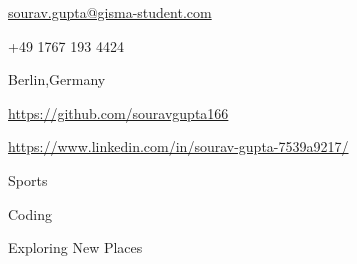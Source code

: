 \documentclass[11pt]{spidercv}
\begin{document}
    \begin{TopBar}{\ColorTextSide}

        \begin{DoubleColumns}
            \begin{ItemList}{\ColorHighlight}
                \item [\Large\faAt] \href{mailto:email@example.com}{sourav.gupta@gisma-student.com}
                \item [\Large\faMobile] +49 1767 193 4424                \item [\Large\faMapMarker] Berlin,Germany
            \end{ItemList}
            \nextcolumn
            \begin{ItemList}{\ColorHighlight}
                \item [\Large\faGithub] \href{https://github.com/ROMAINPC/Spider-CV}{https://github.com/souravgupta166}
                \item [\Large\faLinkedinSquare] \href{https://www.linkedin.com/}{https://www.linkedin.com/in/sourav-gupta-7539a9217/}
            \end{ItemList}
        \end{DoubleColumns}

        \begin{TripleColumns}
            \begin{ItemList}{\ColorHighlight}
                \item [] Sports
            \end{ItemList}
            \nextcolumn
            \begin{ItemList}{\ColorHighlight}
                \item [] Coding
            \end{ItemList}
            \nextcolumn
            \begin{ItemList}{\ColorHighlight}
                \item [] Exploring New Places
            \end{ItemList}
        \end{TripleColumns}
    \end{TopBar}
\end{document}
